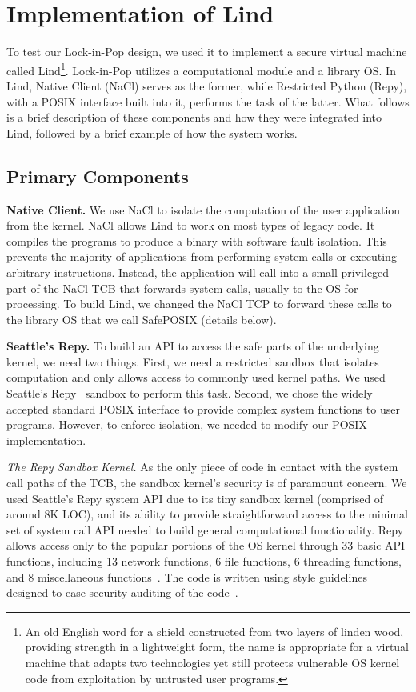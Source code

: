 \section{Implementation of Lind}
\label{sec.implementation}

To test our Lock-in-Pop design, we used it to implement a secure virtual machine
called Lind\footnote{\scriptsize An old English word for a shield constructed from two layers of
linden wood, providing strength in a lightweight form, the name is appropriate for
a virtual machine that adapts two technologies\textendash
yet still protects vulnerable OS kernel code from exploitation by
untrusted user programs.}.
Lock-in-Pop utilizes a
computational module and a library OS. In Lind, Native Client (NaCl) serves as the former,
while Restricted Python (Repy), with a POSIX interface built into it, performs the
task of the latter.
What follows is a brief description of these components and how they were integrated
into Lind, followed by a brief example of how the system works.

\subsection{Primary Components}

\textbf{Native Client.}
We use NaCl to isolate the computation of the user application
from the kernel. NaCl allows Lind to work on most types of legacy code.
It compiles the programs to produce a binary with software fault isolation.
This prevents the majority of applications from performing system calls
or executing arbitrary instructions.
Instead, the application will call into a small privileged
part of the NaCl TCB that forwards system calls, usually to the OS for
processing. To build Lind, we changed the NaCl TCP to
forward these calls to the library OS that we call SafePOSIX (details below).

\textbf{Seattle's Repy.}
To build an API to access the safe parts of the underlying kernel, we need
two things. First, we need a restricted sandbox that isolates computation
and only allows access to commonly used kernel paths.  We used
Seattle's Repy~\cite{Repy-10} sandbox to perform this task.
Second, we chose the widely accepted standard POSIX interface to
provide complex system functions to user programs. However, to enforce isolation,
we needed to modify our POSIX implementation.

\textit{The Repy Sandbox Kernel.}
As the only piece of code in contact with the system call paths of the TCB,
the sandbox kernel's security is of paramount concern.
We used Seattle's Repy system API due to its tiny sandbox kernel
(comprised of around 8K LOC), and its ability to provide straightforward
access to the minimal set of system call API needed to build general
computational functionality. Repy allows
access only to the popular portions of the OS kernel through 33 basic API
functions, including 13 network functions, 6 file functions, 6 threading functions,
and 8 miscellaneous functions~\cite{Repy-10, RepyKernel}. The code is
written using style guidelines designed to ease security auditing
 of the code~\cite{style}.


